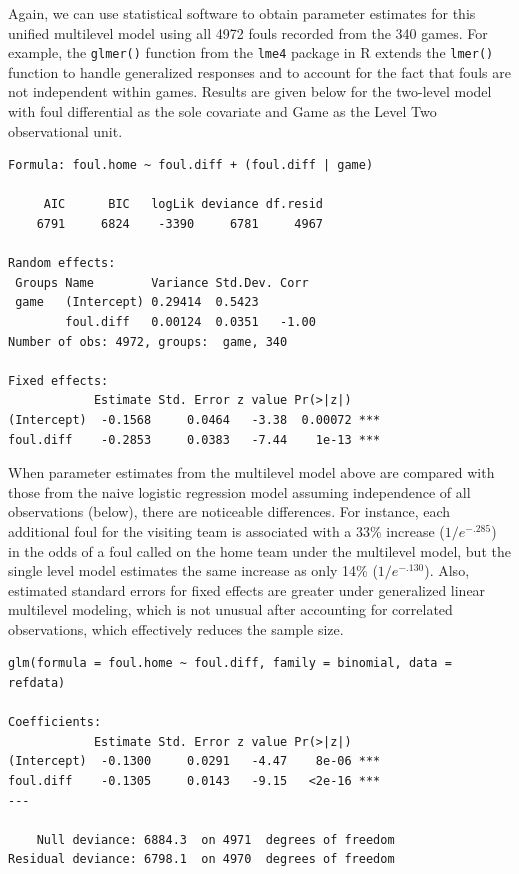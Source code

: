 \documentclass[
]{krantz}
\begin{document}
Again, we can use statistical software to obtain parameter estimates for this unified multilevel model using all 4972 fouls recorded from the 340 games. For example, the \texttt{glmer()} function from the \texttt{lme4} package in R extends the \texttt{lmer()} function to handle generalized responses and to account for the fact that fouls are not independent within games. Results are given below for the two-level model with foul differential as the sole covariate and Game as the Level Two observational unit.

\begin{verbatim}
Formula: foul.home ~ foul.diff + (foul.diff | game)

     AIC      BIC   logLik deviance df.resid 
    6791     6824    -3390     6781     4967 

Random effects:
 Groups Name        Variance Std.Dev. Corr 
 game   (Intercept) 0.29414  0.5423        
        foul.diff   0.00124  0.0351   -1.00
Number of obs: 4972, groups:  game, 340

Fixed effects:
            Estimate Std. Error z value Pr(>|z|)    
(Intercept)  -0.1568     0.0464   -3.38  0.00072 ***
foul.diff    -0.2853     0.0383   -7.44    1e-13 ***
\end{verbatim}

When parameter estimates from the multilevel model above are compared with those from the naive logistic regression model assuming independence of all observations (below), there are noticeable differences. For instance, each additional foul for the visiting team is associated with a 33\% increase (\(1/e^{-.285}\)) in the odds of a foul called on the home team under the multilevel model, but the single level model estimates the same increase as only 14\% (\(1/e^{-.130}\)). Also, estimated standard errors for fixed effects are greater under generalized linear multilevel modeling, which is not unusual after accounting for correlated observations, which effectively reduces the sample size.

\begin{verbatim}
glm(formula = foul.home ~ foul.diff, family = binomial, data = refdata)

Coefficients:
            Estimate Std. Error z value Pr(>|z|)    
(Intercept)  -0.1300     0.0291   -4.47    8e-06 ***
foul.diff    -0.1305     0.0143   -9.15   <2e-16 ***
---

    Null deviance: 6884.3  on 4971  degrees of freedom
Residual deviance: 6798.1  on 4970  degrees of freedom
\end{verbatim}
\end{document}

